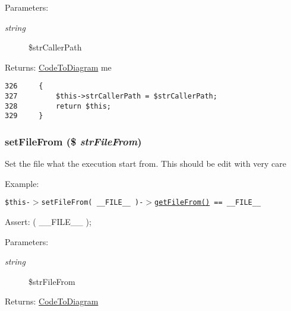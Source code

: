 \begin{Desc}
\item[Parameters:]
\begin{description}
\item[{\em string}]\$strCallerPath \end{description}
\end{Desc}
\begin{Desc}
\item[Returns:]\hyperlink{class_code_to_diagram}{CodeToDiagram} me \end{Desc}


\begin{Code}\begin{verbatim}326     {
327         $this->strCallerPath = $strCallerPath;
328         return $this;
329     }
\end{verbatim}
\end{Code}


\hypertarget{class_code_to_diagram_21031a5ba5b1de38288f09247a4bc413}{
\subsubsection[{setFileFrom}]{\setlength{\rightskip}{0pt plus 5cm}setFileFrom (\$ {\em strFileFrom})}}
\label{class_code_to_diagram_21031a5ba5b1de38288f09247a4bc413}


Set the file what the execution start from. This should be edit with very care

\begin{Desc}
\item[Example:]\end{Desc}
{\tt  \$this-$>$setFileFrom( \_\-\_\-FILE\_\-\_\- )-$>$\hyperlink{class_code_to_diagram_8fea886bcd0b31bd46eca66b26dd18b8}{getFileFrom()} == \_\-\_\-FILE\_\-\_\- } \begin{Desc}
\item[Assert:]( \_\-\_\-FILE\_\-\_\- ); \end{Desc}
\begin{Desc}
\item[Parameters:]
\begin{description}
\item[{\em string}]\$strFileFrom \end{description}
\end{Desc}
\begin{Desc}
\item[Returns:]\hyperlink{class_code_to_diagram}{CodeToDiagram} \end{Desc}


